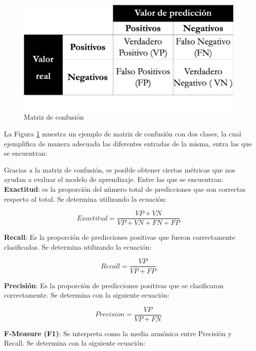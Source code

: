 \begin{figure}[ht]
	\centering
	\includegraphics[scale=.35]{imagenes/Resultados/MatrizC.png}
	\caption{Matriz de confusión}
	\label{fig:mconfu}
\end{figure}

La Figura \ref{fig:mconfu} muestra un ejemplo de matriz de confusión con dos clases, la cual ejemplifica de
manera adecuada las diferentes entradas de la misma, entra las que se encuentran:


Gracias a la matriz de confusión, es posible obtener ciertas métricas que nos ayudan a evaluar el modelo
de aprendizaje. Entre las que se encuentran:\\


\textbf{Exactitud}: es la proporción del número total de predicciones que son correctas respecto al total.
Se determina utilizando la ecuación:

\begin{equation}\label{eq:1}
	Exactitud = \frac{VP+VN}{VP+VN+FN+FP}
\end{equation}

\textbf{Recall}: Es la proporción de predicciones positivas que fueron correctamente clasificadas. Se determina
utilizando la ecuación:


\begin{equation}\label{eq:2}
	Recall = \frac{VP}{VP+FP}
\end{equation}


\textbf{Precisión}: Es la proporción de predicciones positivas que se clasificaron correctamente. Se determina
con la siguiente ecuación:


\begin{equation}\label{eq:3}
	Precision = \frac{VP}{VP+FN}
\end{equation}


\textbf{F-Measure (F1)}: Se interpreta como la media armónica entre Precisión y Recall. Se determina
con la siguiente ecuación:

